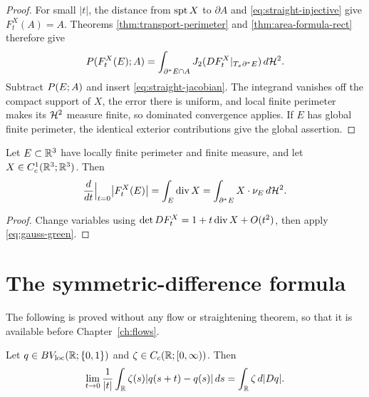 \begin{proof}
For small $|t|$, the distance from $\operatorname{spt} X$ to $\partial A$ and
\eqref{eq:straight-injective} give $F_t^X(A)=A$.  Theorems
\ref{thm:transport-perimeter} and \ref{thm:area-formula-rect} therefore give
\[
 P(F^X_t(E);A)
 =\int_{\partial^* E\cap A}J_2(DF^X_t|_{T_x\partial^* E})\,d\mathcal H^2.
\]
Subtract $P(E;A)$ and insert \eqref{eq:straight-jacobian}.  The integrand
vanishes off the compact support of $X$, the error there is uniform, and
local finite perimeter makes its $\mathcal H^2$ measure finite, so dominated
convergence applies.  If $E$ has global finite perimeter, the identical
exterior contributions give the global assertion.
\end{proof}

\begin{theorem}\label{thm:first-var-volume}
Let $E\subset\mathbb R^3$ have locally finite perimeter and finite measure, and let
$X\in C^1_c(\mathbb R^3;\mathbb R^3)$.  Then
\begin{equation}\label{eq:first-var-volume}
  \frac{d}{dt}\Big|_{t=0}\bigl|F^X_t(E)\bigr|
  =\int_E\operatorname{div} X
  =\int_{\partial^* E}X\cdot\nu_E\,d\mathcal H^2 .
\end{equation}
\end{theorem}

\begin{proof}
Change variables using $\det DF^X_t=1+t\operatorname{div} X+O(t^2)$, then apply
\eqref{eq:gauss-green}.
\end{proof}

\section{The symmetric-difference formula}

The following is proved without any flow or straightening theorem, so that it
is available before Chapter~\ref{ch:flows}.

\begin{lemma}
\label{lem:1d-translation}
Let $q\in BV_{\mathrm{loc}}(\mathbb R;\{0,1\})$ and
$\zeta\in C_c(\mathbb R;[0,\infty))$.  Then
\begin{equation}\label{eq:1d-translation}
  \lim_{t\to0}\frac1{|t|}
  \int_\mathbb R\zeta(s)|q(s+t)-q(s)|\,ds
  =\int_\mathbb R\zeta\,d|Dq|.
\end{equation}
\end{lemma}

